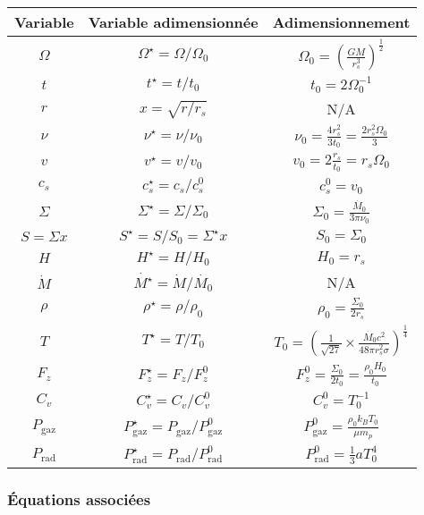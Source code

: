 \begin{center}
    \begin{tabular}{|c|c|c|}
        \hline
        Variable & Variable adimensionnée & Adimensionnement \\
        \hline
        $\Omega$ & $\Omega^\star = \Omega/\Omega_0$ & $\Omega_0 = \left( \frac{G M}{r^3_s} \right)^\frac{1}{2}$ \\
        $t$ & $t^\star = t/t_0$ & $t_0 = 2 \Omega_0^{-1}$ \\
        $r$ & $x = \sqrt{r/r_s}$ & N/A \\
        $\nu$ & $\nu^\star = \nu/\nu_0$ & $\nu_0 = \frac{4 r_s^2}{3 t_0} = \frac{2 r_s^2 \Omega_0}{3}$ \\
        $v$ & $v^\star = v/v_0$ & $v_0 = 2 \frac{r_s}{t_0} = r_s \Omega_0$ \\
        $c_s$ & $c_s^\star = c_s/c_s^0$ & $c_s^0 = v_0$ \\
        $\Sigma$ & $\Sigma^\star = \Sigma/\Sigma_0$ & $\Sigma_0 = \frac{\dot{M_0}}{3 \pi \nu_0}$ \\
        $S = \Sigma x$ & $S^\star = S/S_0 = \Sigma^\star x$ & $S_0 = \Sigma_0$ \\
        $H$ & $H^\star = H/H_0$ & $H_0 = r_s$ \\
        $\dot{M}$ & $\dot{M^\star} = \dot{M}/\dot{M_0}$ & N/A \\
        $\rho$ & $\rho^\star = \rho/\rho_0$ & $\rho_0 = \frac{\Sigma_0}{2 r_s}$ \\
        $T$ & $T^\star = T/T_0$ & $T_0 = \left(\frac{1}{\sqrt{27}} \times \frac{\dot{M_0} c^2}{48 \pi r_s^2 \sigma} \right)^\frac{1}{4}$ \\
        $F_z$ & $F_z^\star = F_z/F_z^0$ & $F_z^0 = \frac{\Sigma_0}{2 t_0} = \frac{\rho_0 H_0}{t_0}$ \\
        $C_v$ & $C_v^\star = C_v/C_v^0$ & $C_v^0 = T_0^{-1}$ \\
        $P_\mathrm{gaz}$ & $P_\mathrm{gaz}^\star = P_\mathrm{gaz}/P_\mathrm{gaz}^0$ & $P_\mathrm{gaz}^0 = \frac{\rho_0 k_B T_0}{\mu m_p}$ \\
        $P_\mathrm{rad}$ & $P_\mathrm{rad}^\star = P_\mathrm{rad}/P_\mathrm{rad}^0$ & $P_\mathrm{rad}^0 = \frac{1}{3} a T_0^4$ \\
        \hline
    \end{tabular}
\end{center}

\subsubsection{Équations associées}

